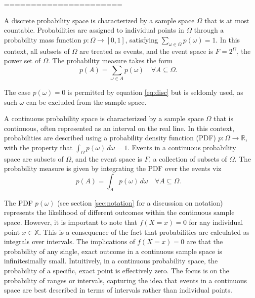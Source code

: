 ======================


\begin{definition}
	A discrete probability space is characterized by a sample space $\Omega$ that is at most countable. Probabilities are assigned to individual points in $\Omega$ through a probability mass function $p: \Omega \rightarrow [0,1]$, satisfying $\sum_{\omega\in \Omega} p(\omega) = 1$. In this context, all subsets of $\Omega$ are treated as events, and the event space is $F = 2^\Omega$, the power set of $\Omega$. The probability measure takes the form
	\begin{equation}
		p(A) = \sum_{\omega \in A} p(\omega) \quad \forall A \subseteq \Omega.
		\label{eq:disc}
	\end{equation}
\end{definition}
The case $p(\omega) = 0$ is permitted by equation \eqref{eq:disc} but is seldomly used, as such $\omega$ can be excluded from the sample space.

\begin{definition}
	A continuous probability space is characterized by a sample space \( \Omega \) that is continuous, often represented as an interval on the real line. In this context, probabilities are described using a probability density function (PDF) \( p: \Omega \rightarrow \mathbb{R} \), with the property that \( \int_{\Omega} p(\omega) \, d\omega = 1 \). Events in a continuous probability space are subsets of \( \Omega \), and the event space is \( F \), a collection of subsets of \( \Omega \). The probability measure is given by integrating the PDF over the events viz
	\begin{equation}
		p(A) = \int_{A} p(\omega) \, d\omega \quad \forall A \subseteq \Omega.
		\label{eq:cont}
	\end{equation}
\end{definition}
The PDF \( p(\omega) \) (see section \ref{sec:notation} for a discussion on notation) represents the likelihood of different outcomes within the continuous sample space.	However, it is important to note that \( f(X=x) = 0 \) for any individual point \( x\in \mathbb{X} \). This is a consequence of the fact that probabilities are calculated as integrals over intervals. The implications of \( f(X=x) = 0 \) are that the probability of any single, exact outcome in a continuous sample space is infinitesimally small. Intuitively, in a continuous probability space, the probability of a specific, exact point is effectively zero. The focus is on the probability of ranges or intervals, capturing the idea that events in a continuous space are best described in terms of intervals rather than individual points.



